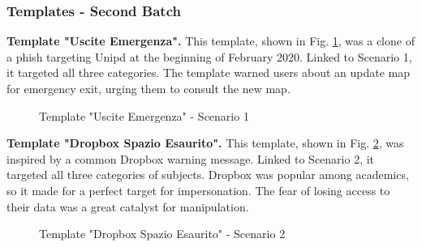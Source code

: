 \documentclass[a4paper]{article}
\begin{document}
\vspace{10mm}

\subsubsection{Templates - Second Batch}

\textbf{Template "Uscite Emergenza".} This template, shown in Fig. \ref{template-s1b2}, was a clone of a phish targeting Unipd at the beginning of February 2020. Linked to Scenario 1, it targeted all three categories. The template warned users about an update map for emergency exit, urging them to consult the new map.

\bigskip

\begin{figure}[H]
	\centering
	\caption{Template "Uscite Emergenza" - Scenario 1}
	\label{template-s1b2}
\end{figure}

\noindent
\textbf{Template "Dropbox Spazio Esaurito".} This template, shown in Fig. \ref{template-s2b2}, was inspired by a common Dropbox warning message. Linked to Scenario 2, it targeted all three categories of subjects. Dropbox was popular among academics, so it made for a perfect target for impersonation. The fear of losing access to their data was a great catalyst for manipulation.

\bigskip

\begin{figure}[H]
	\centering
	\caption{Template "Dropbox Spazio Esaurito" - Scenario 2}
	\label{template-s2b2}
\end{figure}
\end{document}
